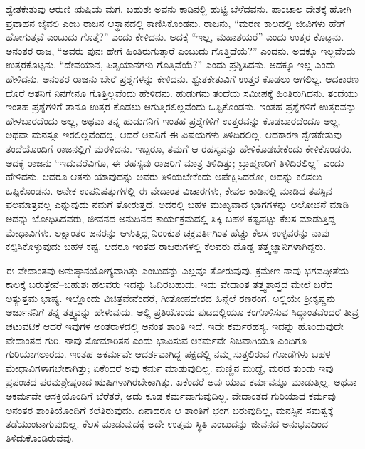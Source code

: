 ಶ್ವೇತಕೇತುವು ಆರುಣಿ ಋಷಿಯ ಮಗ. ಬಹುಶಃ ಅವನು ಕಾಡಿನಲ್ಲಿ ಹುಟ್ಟಿ ಬೆಳೆದವನು. ಪಾಂಚಾಲ ದೇಶಕ್ಕೆ ಹೋಗಿ ಪ್ರವಾಹನ ಜೈವಲಿ ಎಂಬ ರಾಜನ ಆಸ್ಥಾನದಲ್ಲಿ ಕಾಣಿಸಿಕೊಂಡನು. ರಾಜನು, “ಮರಣ ಕಾಲದಲ್ಲಿ ಜೀವಿಗಳು ಹೇಗೆ ಹೋಗುತ್ತವೆ ಎಂಬುದು ಗೊತ್ತೆ?” ಎಂದು ಕೇಳಿದನು. ಅದಕ್ಕೆ “ಇಲ್ಲ, ಮಹಾಶಯರೆ” ಎಂದು ಉತ್ತರ ಕೊಟ್ಟನು. ಅನಂತರ ರಾಜ, “ಅವರು ಪುನಃ ಹೇಗೆ ಹಿಂತಿರುಗುತ್ತಾರೆ ಎಂಬುದು ಗೊತ್ತಿದೆಯೆ?” ಎಂದನು. ಅದಕ್ಕೂ ಇಲ್ಲವೆಂದು ಉತ್ತರಕೊಟ್ಟನು. “ದೇವಯಾನ, ಪಿತೃಯಾನಗಳು ಗೊತ್ತಿವೆಯೆ?” ಎಂದು ಪ್ರಶ್ನಿಸಿದನು. ಅದಕ್ಕೂ ಇಲ್ಲ ಎಂದು ಹೇಳಿದನು. ಅನಂತರ ರಾಜನು ಬೇರೆ ಪ್ರಶ್ನೆಗಳನ್ನು ಕೇಳಿದನು. ಶ್ವೇತಕೇತುವಿಗೆ ಉತ್ತರ ಕೊಡಲು ಆಗಲಿಲ್ಲ. ಆದಕಾರಣ ದೊರೆ ಆತನಿಗೆ ನಿನಗೇನೂ ಗೊತ್ತಿಲ್ಲವೆಂದು ಹೇಳಿದನು. ಹುಡುಗನು ತಂದೆಯ ಸಮೀಪಕ್ಕೆ ಹಿಂತಿರುಗಿದನು. ತಂದೆಯು ಇಂತಹ ಪ್ರಶ್ನೆಗಳಿಗೆ ತಾನೂ ಉತ್ತರ ಕೊಡಲು ಆಗುತ್ತಿರಲಿಲ್ಲವೆಂದು ಒಪ್ಪಿಕೊಂಡನು. ಇಂತಹ ಪ್ರಶ್ನೆಗಳಿಗೆ ಉತ್ತರವನ್ನು ಹೇಳಬಾರದೆಂದು ಅಲ್ಲ, ಅಥವಾ ತನ್ನ ಹುಡುಗನಿಗೆ ಇಂತಹ ಪ್ರಶ್ನೆಗಳಿಗೆ ಉತ್ತರವನ್ನು ಕೊಡಬಾರದೆಂದೂ ಅಲ್ಲ, ಅಥವಾ ಮನಸ್ಸೂ ಇರಲಿಲ್ಲವೆಂದಲ್ಲ. ಆದರೆ ಅವನಿಗೆ ಈ ವಿಷಯಗಳು ತಿಳಿದಿರಲಿಲ್ಲ. ಆದಕಾರಣ ಶ್ವೇತಕೇತುವು ತಂದೆಯೊಂದಿಗೆ ರಾಜನಲ್ಲಿಗೆ ಮರಳಿದನು. ಇಬ್ಬರೂ, ತಮಗೆ ಆ ರಹಸ್ಯವನ್ನು ಹೇಳಿಕೊಡಬೇಕೆಂದು ಕೇಳಿಕೊಂಡರು. ಅದಕ್ಕೆ ರಾಜನು “ಇದುವರೆವಿಗೂ, ಈ ರಹಸ್ಯವು ರಾಜರಿಗೆ ಮಾತ್ರ ತಿಳಿದಿತ್ತು; ಬ್ರಾಹ್ಮಣರಿಗೆ ತಿಳಿದಿರಲಿಲ್ಲ” ಎಂದು ಹೇಳಿದನು. ಆದರೂ ಆತನು ಯಾವುದನ್ನು ಅವರು ತಿಳಿಯಬೇಕೆಂದು ಅಪೇಕ್ಷಿಸಿದರೋ, ಅದನ್ನು ಕಲಿಸಲು ಒಪ್ಪಿಕೊಂಡನು. ಅನೇಕ ಉಪನಿಷತ್ತುಗಳಲ್ಲಿ ಈ ವೇದಾಂತ ವಿಚಾರಗಳು, ಕೇವಲ ಕಾಡಿನಲ್ಲಿ ಮಾಡಿದ ತಪಸ್ಸಿನ ಫಲಮಾತ್ರವಲ್ಲ ಎನ್ನುವುದು ನಮಗೆ ತೋರುತ್ತದೆ. ಅದರಲ್ಲಿ ಬಹಳ ಮುಖ್ಯವಾದ ಭಾಗಗಳನ್ನು ಆಲೋಚನೆ ಮಾಡಿ ಅದನ್ನು ಬೋಧಿಸಿದವರು, ಜೀವನದ ಅನುದಿನದ ಕಾರ್ಯಕ್ರಮದಲ್ಲಿ ಸಿಕ್ಕಿ ಬಹಳ ಕಷ್ಟಪಟ್ಟು ಕೆಲಸ ಮಾಡುತ್ತಿದ್ದ ಮೇಧಾವಿಗಳು. ಲಕ್ಷಾಂತರ ಜನರನ್ನು ಆಳುತ್ತಿದ್ದ ನಿರಂಕುಶ ಚಕ್ರವರ್ತಿಗಿಂತ ಹೆಚ್ಚು ಕೆಲಸ ಉಳ್ಳವರನ್ನು ನಾವು ಕಲ್ಪಿಸಿಕೊಳ್ಳುವುದು ಬಹಳ ಕಷ್ಟ. ಆದರೂ ಇಂತಹ ರಾಜರುಗಳಲ್ಲಿ ಕೆಲವರು ದೊಡ್ಡ ತತ್ತ್ವಜ್ಞಾನಿಗಳಾಗಿದ್ದರು. 

\vskip 6pt

ಈ ವೇದಾಂತವು ಅನುಷ್ಠಾನಯೋಗ್ಯವಾಗಿತ್ತು ಎಂಬುದನ್ನು ಎಲ್ಲವೂ ತೋರುವುವು. ಕ್ರಮೇಣ ನಾವು ಭಗವದ್ಗೀತೆಯ ಕಾಲಕ್ಕೆ ಬರುತ್ತೇನೆ–ಬಹುಶಃ ಹಲವರು ಇದನ್ನು ಓದಿರಬಹುದು. ಇದು ವೇದಾಂತ ತತ್ತ್ವಶಾಸ್ತ್ರದ ಮೇಲೆ ಬರೆದ ಅತ್ಯುತ್ತಮ ಭಾಷ್ಯ. ಇಲ್ಲೊಂದು ವಿಚಿತ್ರವೇನೆಂದರೆ, ಗೀತೋಪದೇಶದ ಹಿನ್ನೆಲೆ ರಣರಂಗ. ಅಲ್ಲಿಯೇ ಶ‍್ರೀಕೃಷ್ಣನು ಅರ್ಜುನನಿಗೆ ತನ್ನ ತತ್ತ್ವವನ್ನು ಹೇಳುವುದು. ಅಲ್ಲಿ ಪ್ರತಿಯೊಂದು ಪುಟದಲ್ಲಿಯೂ ಕಂಗೊಳಿಸುವ ಸಿದ್ಧಾಂತವೆಂದರೆ ತೀವ್ರ ಚಟುವಟಿಕೆ ಆದರೆ ಇವುಗಳ ಅಂತರಾಳದಲ್ಲಿ ಅನಂತ ಶಾಂತಿ ಇದೆ. ಇದೇ ಕರ್ಮರಹಸ್ಯ. ಇದನ್ನು ಹೊಂದುವುದೇ ವೇದಾಂತದ ಗುರಿ. ನಾವು ಸೋಮಾರಿತನ ಎಂದು ಭಾವಿಸುವ ಅಕರ್ಮವೇ ನಿಜವಾಗಿಯೂ ಎಂದಿಗೂ ಗುರಿಯಾಗಲಾರದು. ಇಂತಹ ಅಕರ್ಮವೇ ಆದರ್ಶವಾಗಿದ್ದ ಪಕ್ಷದಲ್ಲಿ ನಮ್ಮ ಸುತ್ತಲಿರುವ ಗೋಡೆಗಳು ಬಹಳ ಮೇಧಾವಿಗಳಾಗಬೇಕಾಗಿತ್ತು; ಏಕೆಂದರೆ ಅವು ಕರ್ಮ ಮಾಡುವುದಿಲ್ಲ. ಮಣ್ಣಿನ ಮುದ್ದೆ, ಮರದ ತುಂಡು ಇವು ಪ್ರಪಂಚದ ಪರಮಶ್ರೇಷ್ಠರಾದ ಋಷಿಗಳಾಗಿರಬೇಕಾಗಿತ್ತು. ಏಕೆಂದರೆ ಅವು ಯಾವ ಕರ್ಮವನ್ನೂ ಮಾಡುತ್ತಿಲ್ಲ. ಅಥವಾ ಅಕರ್ಮವೇ ಆಸಕ್ತಿಯೊಂದಿಗೆ ಬೆರೆತರೆ, ಅದು ಕೂಡ ಕರ್ಮವಾಗುವುದಿಲ್ಲ. ವೇದಾಂತದ ಗುರಿಯಾದ ಕರ್ಮವು ಅನಂತರ ಶಾಂತಿಯೊಂದಿಗೆ ಕಲೆತಿರುವುದು. ಏನಾದರೂ ಆ ಶಾಂತಿಗೆ ಭಂಗ ಬರುವುದಿಲ್ಲ, ಮನಸ್ಸಿನ ಸಮತ್ವಕ್ಕೆ ತಡೆಯುಂಟಾಗುವುದಿಲ್ಲ. ಕೆಲಸ ಮಾಡುವುದಕ್ಕೆ ಅದೇ ಉತ್ತಮ ಸ್ಥಿತಿ ಎಂಬುದನ್ನು ಜೀವನದ ಅನುಭವದಿಂದ ತಿಳಿದುಕೊಂಡಿರುವೆವು. 

